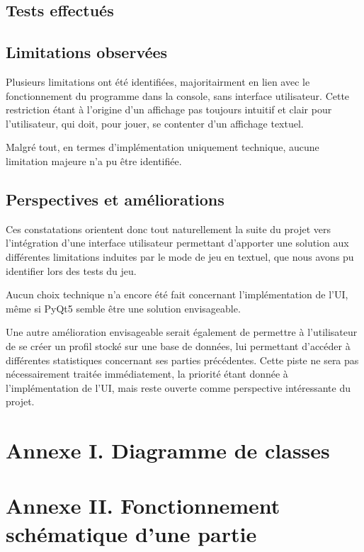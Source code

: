    \subsection{Tests effectués}\label{subsec:tests-effectués}

   \subsection{Limitations observées}\label{subsec:limitations-observées}
      Plusieurs limitations ont été identifiées, majoritairment en lien avec le fonctionnement du programme dans la console, sans interface utilisateur.
      Cette restriction étant à l'origine d'un affichage pas toujours intuitif et clair pour l'utilisateur, qui doit, pour jouer, se contenter d'un affichage textuel.

      Malgré tout, en termes d'implémentation uniquement technique, aucune limitation majeure n'a pu être identifiée.
   
   \subsection{Perspectives et améliorations}\label{subsec:perspectives-et-améliorations}
      Ces constatations orientent donc tout naturellement la suite du projet vers l'intégration d'une interface utilisateur permettant d'apporter une solution aux différentes limitations induites par le mode de jeu en textuel, que nous avons pu identifier lors des tests du jeu.

      Aucun choix technique n'a encore été fait concernant l'implémentation de l'UI, même si PyQt5 semble être une solution envisageable.

      Une autre amélioration envisageable serait également de permettre à l'utilisateur de se créer un profil stocké sur une base de données, lui permettant d'accéder à différentes statistiques concernant ses parties précédentes.
      Cette piste ne sera pas nécessairement traitée immédiatement, la priorité étant donnée à l'implémentation de l'UI\@, mais reste ouverte comme perspective intéressante du projet.

\newpage

\section*{Annexe I. Diagramme de classes}

\newpage

\section*{Annexe II. Fonctionnement schématique d'une partie}
